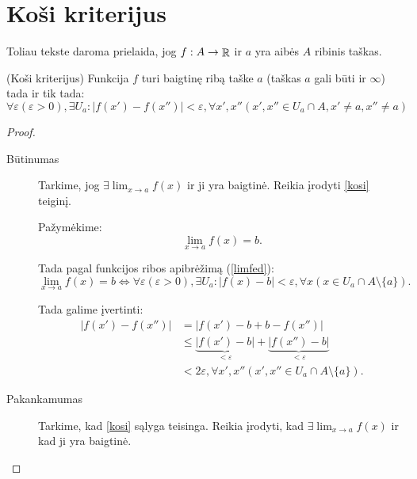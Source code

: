 \section{Koši kriterijus}

\begin{note}
  Toliau tekste daroma prielaida, jog $f: A \to \mathop{\mathbb{R}}$ ir $a$ yra 
  aibės $A$ ribinis taškas.
\end{note}

\begin{prop}
  (Koši kriterijus) Funkcija $f$ turi baigtinę ribą taške $a$
  (taškas $a$ gali būti ir $\infty$) tada ir tik tada:
  \begin{equation}
    \forall \varepsilon (\varepsilon > 0), \exists U_{a} :
    | f(x') - f(x'') | < \varepsilon,
    \forall x', x'' (x',x'' \in U_{a} \cap A, x' \neq a, x'' \neq a)
    \label{kosi}
  \end{equation}

  \begin{proof}
    \hfill \\
    \begin{description}
      \item[Būtinumas] Tarkime, jog $\exists \lim_{x \to a} f(x)$ ir ji
        yra baigtinė. Reikia įrodyti \ref{kosi} teiginį.

        Pažymėkime:
        \begin{equation*}
          \lim_{x \to a} f(x) = b.
        \end{equation*}

        Tada pagal funkcijos ribos apibrėžimą (\ref{limfed}):
        \begin{equation*}
          \lim_{x \to a} f(x) = b \iff 
          \forall \varepsilon (\varepsilon > 0), \exists U_{a}:
          | f(x) - b | < \varepsilon, 
          \forall x (x \in U_{a} \cap A \setminus \{a\}).
        \end{equation*}

        Tada galime įvertinti:
        \begin{align*}
          | f(x') - f(x'') | &= | f(x') - b + b - f(x'') | \\
          &\leq \underbrace{| f(x') - b |}_{ < \varepsilon } +
          \underbrace{| f(x'') - b |}_{ < \varepsilon } \\
          &< 2 \varepsilon, \forall x',x'' 
          (x',x'' \in U_{a} \cap A \setminus \{a\}).
        \end{align*}

      \item[Pakankamumas] Tarkime, kad \ref{kosi} sąlyga teisinga. Reikia 
        įrodyti, kad $\exists \lim_{x \to a} f(x)$ ir kad ji yra baigtinė.


\end{description}
\end{proof}
\end{prop}

